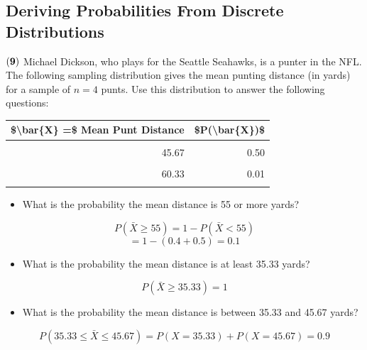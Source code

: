\documentclass[
]{article}
\providecommand{\tightlist}{%
  \setlength{\itemsep}{0pt}\setlength{\parskip}{0pt}}
\begin{document}
\subsection{Deriving Probabilities From Discrete
Distributions}\label{deriving-probabilities-from-discrete-distributions}

\(\bf (9)\) Michael Dickson, who plays for the Seattle Seahawks, is a
punter in the NFL. The following sampling distribution gives the mean
punting distance (in yards) for a sample of \(n=4\) punts. Use this
distribution to answer the following questions:

\begin{table}[H]
\centering\centering
\begin{tabular}{rr}
\toprule
\$\textbackslash{}bar\{X\} =\$ Mean Punt Distance & \$P(\textbackslash{}bar\{X\})\$\\
\midrule
\cellcolor{gray!10}{35.33} & \cellcolor{gray!10}{0.40}\\
45.67 & 0.50\\
\cellcolor{gray!10}{55.00} & \cellcolor{gray!10}{0.08}\\
60.33 & 0.01\\
\cellcolor{gray!10}{65.67} & \cellcolor{gray!10}{0.01}\\
\bottomrule
\end{tabular}
\end{table}

\begin{itemize}
\tightlist
\item
  What is the probability the mean distance is 55 or more yards?
\end{itemize}

{\[ P(\bar{X} \geq 55) = 1- P(\bar{X} < 55)\] \[ = 1-(0.4+0.5) = 0.1 \]}

\begin{itemize}
\tightlist
\item
  What is the probability the mean distance is at least 35.33 yards?
\end{itemize}

{\[ P(\bar{X} \geq 35.33) = 1\]}

\begin{itemize}
\tightlist
\item
  What is the probability the mean distance is between 35.33 and 45.67
  yards?
\end{itemize}

{ \[P(35.33\leq \bar{X} \leq 45.67) = P(X = 35.33)+P(X = 45.67) = 0.9\]
}
\end{document}

